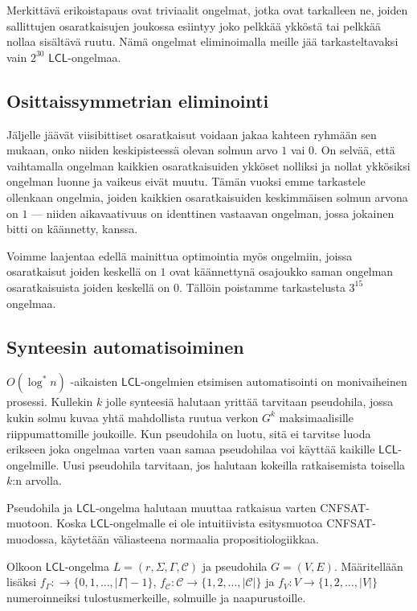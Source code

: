 \documentclass[12pt,finnish]{tktltiki2}
\theoremstyle{definition}
\theoremstyle{remark}
\newcommand*{\lcl}{\ensuremath{\mathsf{LCL}}}
\begin{document}
Merkittävä erikoistapaus ovat triviaalit ongelmat, jotka ovat tarkalleen ne, joiden sallittujen osaratkaisujen joukossa esiintyy joko pelkkää ykköstä tai pelkkää nollaa sisältävä ruutu. Nämä ongelmat eliminoimalla meille jää tarkasteltavaksi vain $2^{30}$ \lcl -ongelmaa.

\subsection{Osittaissymmetrian eliminointi}
Jäljelle jäävät viisibittiset osaratkaisut voidaan jakaa kahteen ryhmään sen mukaan, onko niiden keskipisteessä olevan solmun arvo $1$ vai $0$. On selvää, että vaihtamalla ongelman kaikkien osaratkaisuiden ykköset nolliksi ja nollat ykkösiksi ongelman luonne ja vaikeus eivät muutu. Tämän vuoksi emme tarkastele ollenkaan ongelmia, joiden kaikkien osaratkaisuiden keskimmäisen solmun arvona on $1$ --- niiden aikavaativuus on identtinen vastaavan ongelman, jossa jokainen bitti on käännetty, kanssa.

Voimme laajentaa edellä mainittua optimointia myös ongelmiin, joissa osaratkaisut joiden keskellä on $1$ ovat käännettynä osajoukko saman ongelman osaratkaisuista joiden keskellä on $0$. Tällöin poistamme tarkastelusta $3^{15}$ ongelmaa.

\subsection{Synteesin automatisoiminen}
$O(\log^* n)$ -aikaisten \lcl -ongelmien etsimisen automatisointi on monivaiheinen prosessi. Kullekin $k$ jolle synteesiä halutaan yrittää tarvitaan pseudohila, jossa kukin solmu kuvaa yhtä mahdollista ruutua verkon $G^k$ maksimaalisille riippumattomille joukoille. Kun pseudohila on luotu, sitä ei tarvitse luoda erikseen joka ongelmaa varten vaan samaa pseudohilaa voi käyttää kaikille \lcl -ongelmille. Uusi pseudohila tarvitaan, jos halutaan kokeilla ratkaisemista toisella $k$:n arvolla.


Pseudohila ja \lcl -ongelma halutaan muuttaa ratkaisua varten CNFSAT-muotoon. Koska \lcl -ongelmalle ei ole intuitiivista esitysmuotoa CNFSAT-muodossa, käytetään väliasteena normaalia propositiologiikkaa.

Olkoon \lcl -ongelma $L = (r, \Sigma, \Gamma, \mathcal{C})$ ja pseudohila $G = (V, E)$. Määritellään lisäksi $f_\Gamma : \rightarrow \{ 0, 1, \ldots, |\Gamma|-1\}$, $f_\mathcal{C} : \mathcal{C} \rightarrow \{1, 2, \ldots, |\mathcal{C}|\}$ ja $f_V : V \rightarrow \{1, 2, \ldots, |V|\}$  numeroinneiksi tulostusmerkeille, solmuille ja naapurustoille.
\end{document}
